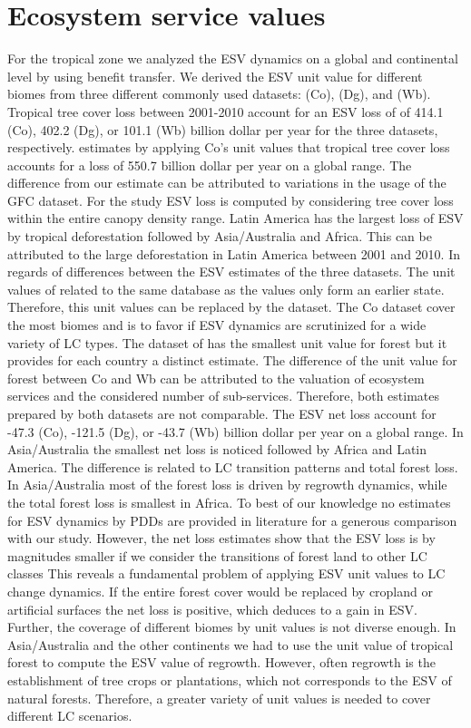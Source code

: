 	\section{Ecosystem service values}
		For the tropical zone we analyzed the \ac{ESV} dynamics on a global and continental level by using benefit transfer. We derived the \ac{ESV} unit value for different biomes from three different commonly used datasets: \citet{Costanza2014} (Co), \citet{Groot2012} (Dg), and \citet{Siikamaki2015} (Wb). Tropical tree cover loss between 2001-2010 account for an \ac{ESV} loss of of 414.1 (Co), 402.2 (Dg), or 101.1 (Wb) billion dollar per year for the three datasets, respectively. \citet{Song2018} estimates by applying Co's unit values that tropical tree cover loss accounts for a loss of 550.7 billion dollar per year on a global range. The difference from our estimate can be attributed to variations in the usage of the \ac{GFC} dataset. For the study \ac{ESV} loss is computed by considering tree cover loss within the entire canopy density range. Latin America has the largest loss of \ac{ESV} by tropical deforestation followed by Asia/Australia and Africa. This can be attributed to the large deforestation in Latin America between 2001 and 2010. In regards of differences between the \ac{ESV} estimates of the three datasets. The unit values of \citet{Groot2012} related to the same database as the \citet{Costanza2014} values only form an earlier state. Therefore, this unit values can be replaced by the \citet{Costanza2014} dataset. The Co dataset cover the most biomes and is to favor if \ac{ESV} dynamics are scrutinized for a wide variety of \ac{LC} types. The dataset of \citet{Siikamaki2015} has the smallest unit value for forest but it provides for each country a distinct estimate. The difference of the unit value for forest between Co and Wb can be attributed to the valuation of ecosystem services and the considered number of sub-services. Therefore, both estimates prepared by both datasets are not comparable. The \ac{ESV} net loss account for -47.3 (Co), -121.5 (Dg), or -43.7 (Wb) billion dollar per year on a global range. In Asia/Australia the smallest net loss is noticed followed by Africa and Latin America. The difference is related to \ac{LC} transition patterns and total forest loss. In Asia/Australia most of the forest loss is driven by regrowth dynamics, while the total forest loss is smallest in Africa. To best of our knowledge no estimates for \ac{ESV} dynamics by \acp{PDD} are provided in literature for a generous comparison with our study. However, the net loss estimates show that the \ac{ESV} loss is by magnitudes smaller if we consider the transitions of forest land to other \ac{LC} classes This reveals a fundamental problem of applying \ac{ESV} unit values to \ac{LC} change dynamics. If the entire forest cover would be replaced by cropland or artificial surfaces the net loss is positive, which deduces to a gain in \ac{ESV}. Further, the coverage of different biomes by unit values is not diverse enough. In Asia/Australia and the other continents we had to use the unit value of tropical forest to compute the \ac{ESV} value of regrowth. However, often regrowth is the establishment of tree crops or plantations, which not corresponds to the \ac{ESV} of natural forests. Therefore, a greater variety of unit values is needed to cover different \ac{LC} scenarios.